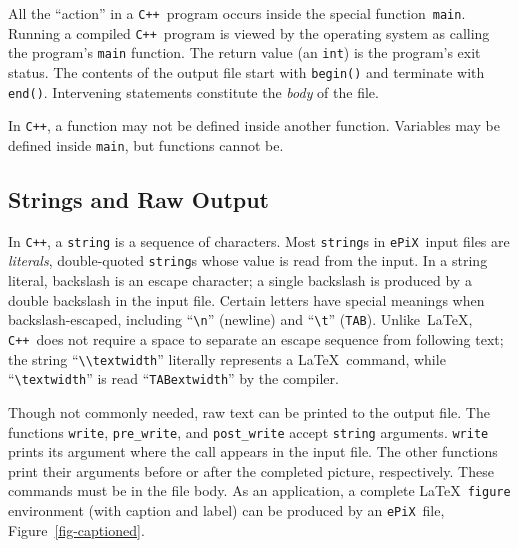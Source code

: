 \documentclass[12pt,letterpaper]{book}
\newcommand{\code}[1]{\texttt{#1}}
\newcommand{\Key}[1]{\texttt{#1}}
\newcommand{\ePiX}{\code{ePiX}}
\newcommand{\CXX}{\code{C++}}
\begin{document}
All the ``action'' in a \CXX\ program occurs inside the special
function~\code{main}. Running a compiled \CXX~program is viewed by the
operating system as calling the program's \code{main} function. The
return value (an \code{int}) is the program's exit status.  The
contents of the output file start with \code{begin()} and terminate
with \code{end()}.  Intervening statements constitute the \emph{body}
of the file.

In \CXX, a function may not be defined inside another function. 
Variables may be defined inside \code{main}, but functions cannot be.


\subsection{Strings and Raw Output} 

%
%
In \CXX, a \code{string} is a sequence of characters. Most
\code{string}s in \ePiX\ input files are \emph{literals},
double-quoted \code{string}s whose value is read from the input. In a
string literal, backslash is an escape character; a single backslash
is produced by a double backslash in the input file.  Certain letters
have special meanings when backslash-escaped, including ``\verb+\n+''
(newline) and ``\verb+\t+'' (\Key{TAB}).  Unlike~\LaTeX, \CXX~does not
require a space to separate an escape sequence from following text;
the string ``\verb+\\textwidth+'' literally represents a \LaTeX\
command, while ``\verb+\textwidth+'' is read ``\code{TABextwidth}'' by
the compiler.

%
%
%
Though not commonly needed, raw text can be printed to the output
file. The functions \code{write}, \code{pre\_write}, and
\code{post\_write} accept \code{string} arguments. \code{write} prints
its argument where the call appears in the input file. The other
functions print their arguments before or after the completed picture,
respectively. These commands must be in the file body.  As an
application, a complete \LaTeX\ \code{figure} environment (with
caption and label) can be produced by an \ePiX\ file,
Figure~\ref{fig-captioned}.
\end{document}
